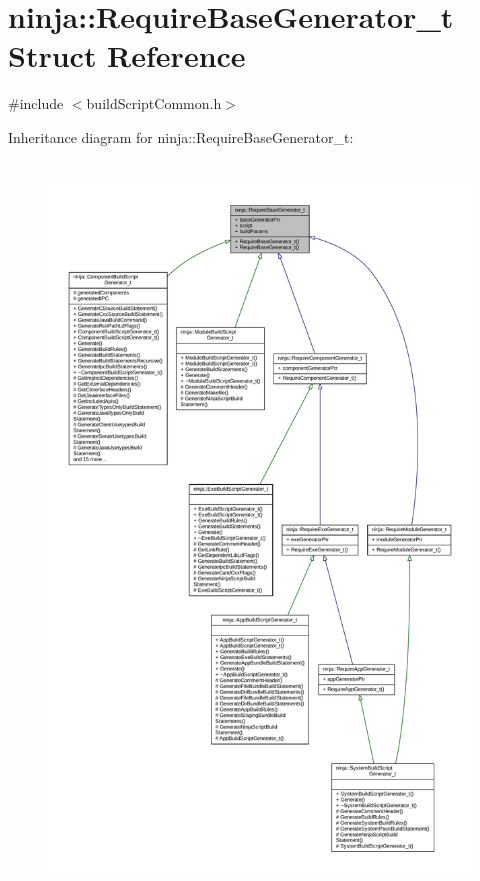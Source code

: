 \hypertarget{structninja_1_1_require_base_generator__t}{}\section{ninja\+:\+:Require\+Base\+Generator\+\_\+t Struct Reference}
\label{structninja_1_1_require_base_generator__t}


{\ttfamily \#include $<$build\+Script\+Common.\+h$>$}



Inheritance diagram for ninja\+:\+:Require\+Base\+Generator\+\_\+t\+:
\nopagebreak
\begin{figure}[H]
\begin{center}
\leavevmode
\includegraphics[height=550pt]{structninja_1_1_require_base_generator__t__inherit__graph}
\end{center}
\end{figure}


